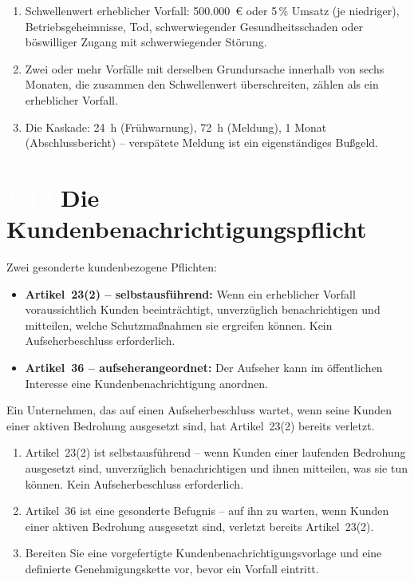 \documentclass[11pt,a4paper,twoside]{book}
\newcommand{\lessontag}[1]{%
  \texorpdfstring{%
    \setlength{\fboxsep}{3pt}\colorbox{nisd2blue}{\textcolor{white}{\footnotesize\bfseries #1}}\quad%
  }{Lektion #1\ }%
}
\begin{document}
\begin{keytakeaways}
\begin{enumerate}
  \item Schwellenwert erheblicher Vorfall: 500.000~\euro{} oder 5\,\% Umsatz (je niedriger), Betriebsgeheimnisse, Tod, schwerwiegender Gesundheitsschaden oder böswilliger Zugang mit schwerwiegender Störung.
  \item Zwei oder mehr Vorfälle mit derselben Grundursache innerhalb von sechs Monaten, die zusammen den Schwellenwert überschreiten, zählen als ein erheblicher Vorfall.
  \item Die Kaskade: 24~h (Frühwarnung), 72~h (Meldung), 1 Monat (Abschlussbericht) -- verspätete Meldung ist ein eigenständiges Bußgeld.
\end{enumerate}
\end{keytakeaways}

\section{\lessontag{1.12}Die Kundenbenachrichtigungspflicht}

Zwei gesonderte kundenbezogene Pflichten:
\begin{itemize}
  \item \textbf{Artikel~23(2) -- selbstausführend:} Wenn ein erheblicher Vorfall voraussichtlich Kunden beeinträchtigt, unverzüglich benachrichtigen und mitteilen, welche Schutzmaßnahmen sie ergreifen können. Kein Aufseherbeschluss erforderlich.
  \item \textbf{Artikel~36 -- aufseherangeordnet:} Der Aufseher kann im öffentlichen Interesse eine Kundenbenachrichtigung anordnen.
\end{itemize}

Ein Unternehmen, das auf einen Aufseherbeschluss wartet, wenn seine Kunden einer aktiven Bedrohung ausgesetzt sind, hat Artikel~23(2) bereits verletzt.

\begin{keytakeaways}
\begin{enumerate}
  \item Artikel~23(2) ist selbstausführend -- wenn Kunden einer laufenden Bedrohung ausgesetzt sind, unverzüglich benachrichtigen und ihnen mitteilen, was sie tun können. Kein Aufseherbeschluss erforderlich.
  \item Artikel~36 ist eine gesonderte Befugnis -- auf ihn zu warten, wenn Kunden einer aktiven Bedrohung ausgesetzt sind, verletzt bereits Artikel~23(2).
  \item Bereiten Sie eine vorgefertigte Kundenbenachrichtigungsvorlage und eine definierte Genehmigungskette vor, bevor ein Vorfall eintritt.
\end{enumerate}
\end{keytakeaways}
\end{document}
